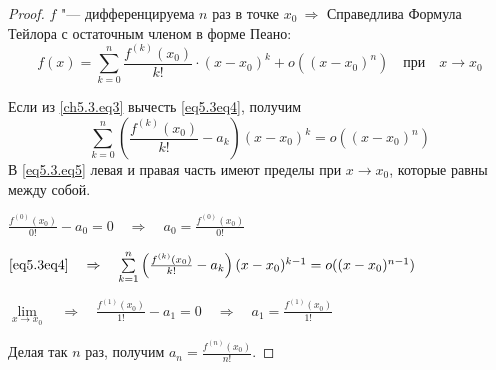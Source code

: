 \begin{proof}
$f$ "--- дифференцируема $n$ раз в точке $x_0 \ \Rightarrow$
Справедлива Формула Тейлора с остаточным членом в форме Пеано:
\begin{equation} \label{eq5.3eq4}
f(x) = \sum_{k = 0}^{n} \frac{f^{(k)}(x_0)}{k!} \cdot (x - x_0)^k + o((x - x_0)^n) \quad \text{при} \quad x \to x_0
\end{equation}

Если из \eqref{ch5.3.eq3} вычесть \eqref{eq5.3eq4}, получим
\begin{equation} \label{eq5.3.eq5}
\sum\limits_{k = 0}^{n} \left( \frac{f^{(k)}(x_0)}{k!} - a_k \right) (x - x_0)^k = o((x - x_0)^n)
\end{equation}
В \eqref{eq5.3.eq5} левая и правая часть имеют пределы при $x \to x_0$, которые равны между собой.

$\frac{f^{(0)}(x_0)}{0!} - a_0 = 0 \quad \Rightarrow \quad a_0 = \frac{f^{(0)}(x_0)}{0!}$

$\eqref{eq5.3eq4} \quad \Rightarrow \quad \sum\limits_{k = 1}^{n} \left( \frac{f^{(k)}(x_0)}{k!} - a_k \right) (x - x_0)^{k - 1} = o((x - x_0)^{n - 1})$

$\lim\limits_{x \to x_0} \quad \Rightarrow \quad \frac{f^{(1)}(x_0)}{1!} - a_1 = 0 \quad \Rightarrow \quad a_1 = \frac{f^{(1)}(x_0)}{1!}$

Делая так $n$ раз, получим $a_n = \frac{f^{(n)}(x_0)}{n!}$.
\end{proof}

